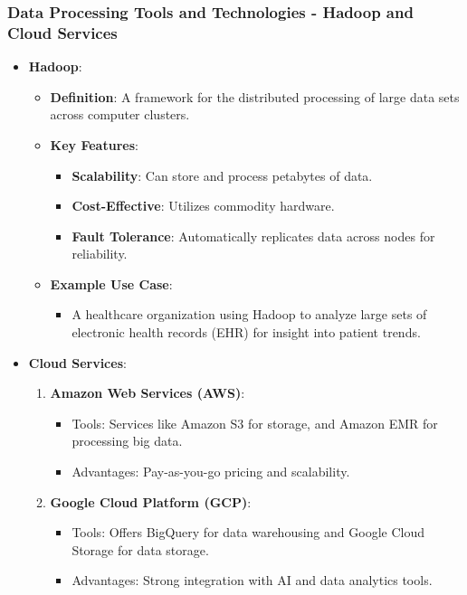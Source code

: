 \documentclass{beamer}
\begin{document}
\begin{frame}[fragile]
    \frametitle{Data Processing Tools and Technologies - Hadoop and Cloud Services}
    \begin{itemize}
        \item \textbf{Hadoop}:
        \begin{itemize}
            \item \textbf{Definition}: A framework for the distributed processing of large data sets across computer clusters.
            \item \textbf{Key Features}:
            \begin{itemize}
                \item \textbf{Scalability}: Can store and process petabytes of data.
                \item \textbf{Cost-Effective}: Utilizes commodity hardware.
                \item \textbf{Fault Tolerance}: Automatically replicates data across nodes for reliability.
            \end{itemize}
            \item \textbf{Example Use Case}:
            \begin{itemize}
                \item A healthcare organization using Hadoop to analyze large sets of electronic health records (EHR) for insight into patient trends.
            \end{itemize}
        \end{itemize}
        
        \item \textbf{Cloud Services}:
        \begin{enumerate}
            \item \textbf{Amazon Web Services (AWS)}: 
                \begin{itemize}
                    \item Tools: Services like Amazon S3 for storage, and Amazon EMR for processing big data.
                    \item Advantages: Pay-as-you-go pricing and scalability.
                \end{itemize}
                
            \item \textbf{Google Cloud Platform (GCP)}: 
                \begin{itemize}
                    \item Tools: Offers BigQuery for data warehousing and Google Cloud Storage for data storage.
                    \item Advantages: Strong integration with AI and data analytics tools.
                \end{itemize}
                

\end{enumerate}
\end{itemize}
\end{frame}
\end{document}
